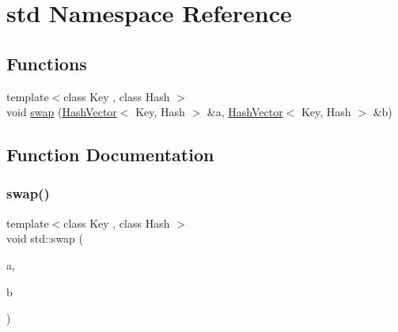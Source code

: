 \hypertarget{namespacestd}{}\section{std Namespace Reference}
\label{namespacestd}
\subsection*{Functions}
\begin{DoxyCompactItemize}
\item 
{\footnotesize template$<$class Key , class Hash $>$ }\\void \mbox{\hyperlink{namespacestd_ac70f28fd42170cf32871bd027855fd78}{swap}} (\mbox{\hyperlink{class_hash_vector}{Hash\+Vector}}$<$ Key, Hash $>$ \&a, \mbox{\hyperlink{class_hash_vector}{Hash\+Vector}}$<$ Key, Hash $>$ \&b)
\end{DoxyCompactItemize}


\subsection{Function Documentation}
\mbox{\label{namespacestd_ac70f28fd42170cf32871bd027855fd78}} 
\subsubsection{\texorpdfstring{swap()}{swap()}}
{\footnotesize\ttfamily template$<$class Key , class Hash $>$ \\
void std\+::swap (\begin{DoxyParamCaption}\item[{\mbox{\hyperlink{class_hash_vector}{Hash\+Vector}}$<$ Key, Hash $>$ \&}]{a,  }\item[{\mbox{\hyperlink{class_hash_vector}{Hash\+Vector}}$<$ Key, Hash $>$ \&}]{b }\end{DoxyParamCaption})}

